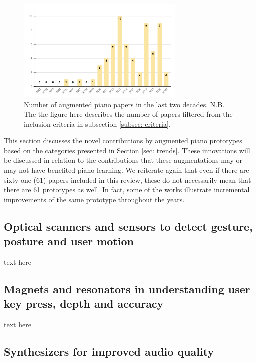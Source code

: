 \documentclass[sigchi, review]{acmart}
\begin{document}
\begin{figure}[t]
    \centering
    \includegraphics[width=8cm]{figures/yearchart.png}
    \caption{Number of augmented piano papers in the last two decades. N.B. The the figure here describes the number of papers filtered from the inclusion criteria in subsection \ref{subsec: criteria}. }
    \label{fig:doublechart}
\end{figure}  
This section discusses the novel contributions by augmented piano prototypes based on the categories presented in Section \ref{sec: trends}. These innovations will be discussed in relation to the contributions that these augmentations may or may not have benefited piano learning. We reiterate again that even if there are sixty-one (61) papers included in this review, these do not necessarily mean that there are 61 prototypes as well. In fact, some of the works illustrate incremental improvements of the same prototype throughout the years. 

\subsection{Optical scanners and sensors to detect gesture, posture and user motion}
\label{subsec: gesture}
 text here

\subsection{Magnets and resonators in understanding user key press, depth and accuracy}
\label{subsec: magnets}

text here 

\subsection{Synthesizers for improved audio quality}
\label{subsec: synth}
\end{document}
